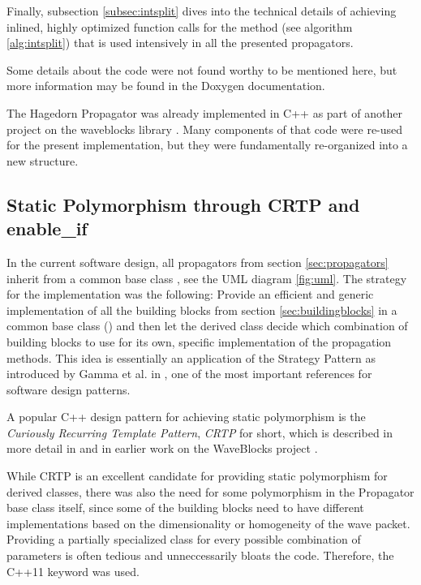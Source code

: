 Finally, subsection \ref{subsec:intsplit} dives into the technical details of achieving inlined, highly optimized function calls for the  method (see algorithm \ref{alg:intsplit}) that is used intensively in all the presented propagators.
\par\medskip
%
Some details about the code were not found worthy to be mentioned here,
but more information may be found in the Doxygen documentation.
\par\medskip
%
The Hagedorn Propagator was already implemented in C++ as part of another project on the waveblocks library \cite{libwaveblocks}.
Many components of that code were re-used for the present implementation, but they were fundamentally re-organized into a new structure.


\subsection{Static Polymorphism through CRTP and enable\_if}
\label{subsec:poly}
%
In the current software design, all propagators from section \ref{sec:propagators} inherit from a common base class , see the UML diagram \ref{fig:uml}.
The strategy for the implementation was the following:
Provide an efficient and generic implementation of all the building blocks from section \ref{sec:buildingblocks} in a common base class () and then let the derived class decide which combination of building blocks to use for its own, specific implementation of the propagation methods.
This idea is essentially an application of the Strategy Pattern as introduced by Gamma et al. in \cite{Gamma1995}, one of the most important references for software design patterns.
\par\medskip
%
A popular C++ design pattern for achieving static polymorphism is the \emph{Curiously Recurring Template Pattern}, \emph{CRTP} for short, which is described in more detail in \cite{C_CRTP} and in earlier work on the WaveBlocks project \cite{libwaveblocks}.
\par\medskip
%
While CRTP is an excellent candidate for providing static polymorphism for derived classes, there was also the need for some polymorphism in the Propagator base class itself, since some of the building blocks need to have different implementations based on the dimensionality or homogeneity of the wave packet. 
Providing a partially specialized class for every possible combination of parameters is often tedious and unneccessarily bloats the code.
Therefore, the C++11  keyword was used.
